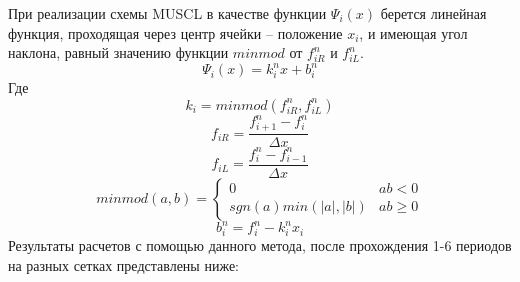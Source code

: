 \documentclass[12pt,a4paper]{article}
\begin{document}
При реализации схемы MUSCL в качестве функции $\Psi_i(x)$ берется линейная функция, проходящая через центр ячейки – положение $x_i$, и имеющая угол наклона, равный значению  функции $minmod$ от $f_{iR}^n$ и $f_{iL}^n$.
\\
\medskip
\[
\Psi_i(x)=k_i^nx+b_i^n
\]
Где
\[
k_i=minmod(f_{iR}^n, f_{iL}^n)
\]
\[
f_{iR}=\frac{f_{i+1}^n-f_i^n}{\Delta x}
\]
\[
f_{iL}=\frac{f_i^n-f_{i-1}^n}{\Delta x}
\]
\[
minmod(a, b) = \begin{cases}0 & ab<0\\ sgn(a)min(|a|,|b|) & ab \geq 0\end{cases}
\]
\[
b_i^n=f_i^n-k_i^nx_i
\]
Результаты расчетов с помощью данного метода, после прохождения 1-6 периодов на разных сетках представлены ниже:
\\
\end{document}
